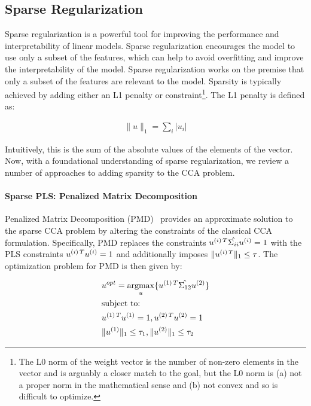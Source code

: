 \subsection{Sparse Regularization}

Sparse regularization is a powerful tool for improving the performance and interpretability of linear models.
Sparse regularization encourages the model to use only a subset of the features, which can help to avoid overfitting and improve the interpretability of the model.
Sparse regularization works on the premise that only a subset of the features are relevant to the model.
Sparsity is typically achieved by adding either an L1 penalty or constraint\footnote{The L0 norm of the weight vector is the number of non-zero elements in the vector and is arguably a closer match to the goal, but the L0 norm is (a) not a proper norm in the mathematical sense and (b) not convex and so is difficult to optimize.}.
The L1 penalty is defined as:

\begin{align}
    \|u\|_1 = \sum_i |u_i|
\end{align}

Intuitively, this is the sum of the absolute values of the elements of the vector.
Now, with a foundational understanding of sparse regularization, we review a number of approaches to adding sparsity to the CCA problem.

\paragraph{Sparse PLS: Penalized Matrix Decomposition}
Penalized Matrix Decomposition (PMD)~\citep{witten2009penalized} provides an approximate solution to the sparse CCA problem by altering the constraints of the classical CCA formulation.
Specifically, PMD replaces the constraints \(u^{(i)\,T} \hat{\Sigma_{ii}} u^{(i)} = 1\) with the PLS constraints \(u^{(i)\,T} u^{(i)}= 1\) and additionally imposes \(\|u^{(i)\,T}\|_1 \leq \tau\).
The optimization problem for PMD is then given by:

\begin{align}
    & u^{opt}=\underset{u}{\mathrm{argmax}}\{ u^{(1)\,T} \hat{\Sigma_{12}} u^{(2)} \} \\
    & \text{subject to:} \notag \\
    & u^{(1)\,T} u^{(1)} = 1 , u^{(2)\,T} u^{(2)} = 1 \notag \\
    & \|u^{(1)}\|_1 \leq \tau_1 , \|u^{(2)}\|_1 \leq \tau_2 \notag
\end{align}


